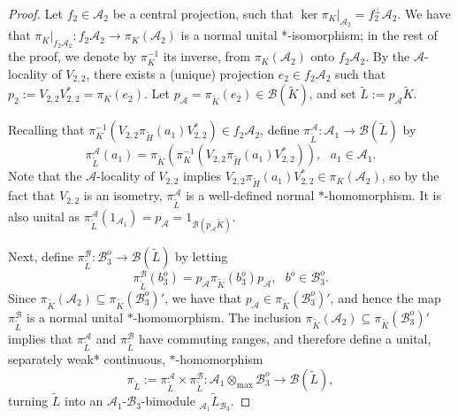 \documentclass[11pt]{amsart}
\theoremstyle{definition}
\newcommand{\cl}[1]{\mathcal{#1}}
\newcommand{\ten}{\otimes}
\providecommand{\wt}[1]{\widetilde{#1}}
\begin{document}
\begin{proof}
Let $f_2\in \cl{A}_2$ be a central projection, such that 
$\ker \pi_K|_{\cl{A}_2} = f_2^{\perp} \cl{A}_2$. We have that 
$\pi_K|_{f_2 \cl{A}_2} : f_2 \cl{A}_2\to \pi_K(\cl{A}_2)$ is a normal unital *-isomorphism; 
in the rest of the proof, we denote by $\pi_K^{-1}$ its inverse, from 
$\pi_K(\cl{A}_2)$ onto $f_2\cl{A}_2$. 
By the $\cl{A}$-locality of $V_{2,2}$, there exists 
a (unique) projection $e_2\in f_2\cl{A}_2$ such that $p_{2} := V_{2,2}V_{2,2}^* = \pi_{K}(e_2)$. 
Let $p_\cl{A} = \pi_{\wt{K}}(e_2)\in\cl B(\wt{K})$, 
and set $\wt{L}:=p_\cl{A}\wt{K}$. 

Recalling that 
$\pi_K^{-1}(V_{2,2}\pi_{\wt{H}}(a_1)V_{2,2}^*)\in f_2\cl{A}_2$, 
define $\pi^\cl{A}_{\wt{L}}:\cl{A}_1\to\cl B(\wt{L})$ by
$$\pi^\cl{A}_{\wt{L}}(a_1)=\pi_{\wt{K}}(\pi_K^{-1}(V_{2,2}\pi_{\wt{H}}(a_1)V_{2,2}^*)), \ \ \ a_1\in \cl{A}_1.$$
Note that the $\cl{A}$-locality of $V_{2,2}$ implies $V_{2,2}\pi_{\wt{H}}(a_1)V_{2,2}^*\in\pi_{K}(\cl{A}_2)$, so by 
the fact that $V_{2,2}$ is an isometry, 
$\pi^\cl{A}_{\wt{L}}$ is a well-defined normal $*$-homomorphism. It is also unital as $\pi^\cl{A}_{\wt{L}}(1_{\cl{A}_1})=p_\cl{A}=1_{\cl B(p_\cl{A}\wt{K})}$. 

Next, define $\pi^\cl{B}_{\wt{L}} : \cl{B}_3^o\to\cl B(\wt{L})$ by 
letting 
$$\pi^\cl{B}_{\wt{L}}(b_3^o) = p_\cl{A}\pi_{\wt{K}}(b_3^o)p_\cl{A}, \ \ \ b^o\in \cl{B}_3^o.$$
Since $\pi_{\wt{K}}(\cl{A}_2)\subseteq\pi_{\wt{K}}(\cl{B}_3^o)'$, we have that 
$p_\cl{A}\in \pi_{\wt{K}}(\cl{B}_3^o)'$, and hence the map 
$\pi^\cl{B}_{\wt{L}}$ is a normal unital $*$-homomorphism. The inclusion 
$\pi_{\wt{K}}(\cl{A}_2)\subseteq\pi_{\wt{K}}(\cl{B}_3^o)'$ implies that $\pi^\cl{A}_{\wt{L}}$ and $\pi^\cl{B}_{\wt{L}}$ have commuting ranges, and therefore define a unital, 
separately weak* continuous, $*$-homomorphism 
$$\pi_{\wt{L}} := \pi^\cl{A}_{\wt{L}}\times \pi^\cl{B}_{\wt{L}}
: \cl{A}_1\ten_{\max}\cl{B}_3^o \to\cl B(\wt{L}),$$
turning $\wt{L}$ into an $\cl{A}_1$-$\cl{B}_3$-bimodule $_{\cl{A}_1}\wt{L}_{\cl{B}_3}$. 


\end{proof}
\end{document}
